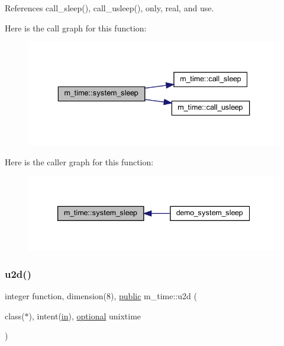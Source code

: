 \begin{DoxyVerb}
References call\+\_\+sleep(), call\+\_\+usleep(), only, real, and use.

Here is the call graph for this function\+:
\nopagebreak
\begin{figure}[H]
\begin{center}
\leavevmode
\includegraphics[width=336pt]{namespacem__time_a7c5d028ae1e1e01162ffc7bb55dcbbb1_cgraph}
\end{center}
\end{figure}
Here is the caller graph for this function\+:
\nopagebreak
\begin{figure}[H]
\begin{center}
\leavevmode
\includegraphics[width=339pt]{namespacem__time_a7c5d028ae1e1e01162ffc7bb55dcbbb1_icgraph}
\end{center}
\end{figure}
\mbox{\label{namespacem__time_a083bc231f8ba1879d7f86ab424e77d6c}} 
\subsubsection{\texorpdfstring{u2d()}{u2d()}}
{\footnotesize\ttfamily integer function, dimension(8), \hyperlink{M__stopwatch_83_8txt_a2f74811300c361e53b430611a7d1769f}{public} m\+\_\+time\+::u2d (\begin{DoxyParamCaption}\item[{class($\ast$), intent(\hyperlink{M__journal_83_8txt_afce72651d1eed785a2132bee863b2f38}{in}), \hyperlink{option__stopwatch_83_8txt_aa4ece75e7acf58a4843f70fe18c3ade5}{optional}}]{unixtime }\end{DoxyParamCaption})}




\end{DoxyVerb}
